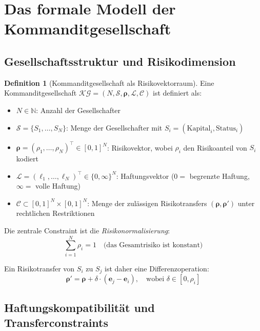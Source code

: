 \documentclass[a4paper, 12pt, twoside, openright]{report}
\theoremstyle{definition}
\newtheorem{definition}[theorem]{Definition}
\theoremstyle{definition}
\begin{document}
\section{Das formale Modell der Kommanditgesellschaft}

\subsection{Gesellschaftsstruktur und Risikodimension}

\begin{definition}[Kommanditgesellschaft als Risikovektorraum]
Eine Kommanditgesellschaft $\mathcal{KG} = (N, \mathcal{S}, \boldsymbol{\rho}, \mathcal{L}, \mathcal{C})$ ist definiert als:
\begin{itemize}
    \item $N \in \mathbb{N}$: Anzahl der Gesellschafter
    \item $\mathcal{S} = \{S_1, \ldots, S_N\}$: Menge der Gesellschafter mit $S_i = (\text{Kapital}_i, \text{Status}_i)$
    \item $\boldsymbol{\rho} = (\rho_1, \ldots, \rho_N)^{\top} \in [0,1]^N$: Risikovektor, wobei $\rho_i$ den Risikoanteil von $S_i$ kodiert
    \item $\mathcal{L} = (\ell_1, \ldots, \ell_N)^{\top} \in \{0, \infty\}^N$: Haftungsvektor ($0 = $ begrenzte Haftung, $\infty = $ volle Haftung)
    \item $\mathcal{C} \subset [0,1]^N \times [0,1]^N$: Menge der zulässigen Risikotransfers $({\boldsymbol{\rho}}, {\boldsymbol{\rho}}')$ unter rechtlichen Restriktionen
\end{itemize}
\end{definition}

Die zentrale Constraint ist die \emph{Risikonormalisierung}:
\begin{equation}
\sum_{i=1}^N \rho_i = 1 \quad \text{(das Gesamtrisiko ist konstant)}
\end{equation}

Ein Risikotransfer von $S_i$ zu $S_j$ ist daher eine Differenzoperation:
\begin{equation}
\boldsymbol{\rho}' = \boldsymbol{\rho} + \delta \cdot (\mathbf{e}_j - \mathbf{e}_i), \quad \text{wobei } \delta \in [0, \rho_i]
\end{equation}

\subsection{Haftungskompatibilität und Transferconstraints}
\end{document}
